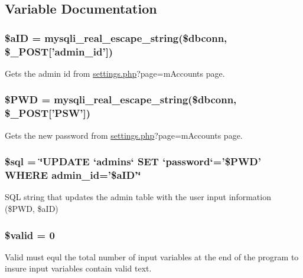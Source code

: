 \subsection{\-Variable \-Documentation}
\hypertarget{adminPReset_8php_a493f3ef0624131954dba9970f1808e66}{
\subsubsection[{\$a\-I\-D}]{\setlength{\rightskip}{0pt plus 5cm}\$a\-I\-D = mysqli\-\_\-real\-\_\-escape\-\_\-string(\$dbconn, \$\-\_\-\-P\-O\-S\-T\mbox{[}'admin\-\_\-id'\mbox{]})}}\label{adminPReset_8php_a493f3ef0624131954dba9970f1808e66}
\-Gets the admin id from \hyperlink{settings_8php}{settings.\-php}?page=m\-Accounts page. \hypertarget{adminPReset_8php_ad10f6388800bdf18e795c1afd61faab1}{
\subsubsection[{\$\-P\-W\-D}]{\setlength{\rightskip}{0pt plus 5cm}\$\-P\-W\-D = mysqli\-\_\-real\-\_\-escape\-\_\-string(\$dbconn, \$\-\_\-\-P\-O\-S\-T\mbox{[}'\-P\-S\-W'\mbox{]})}}\label{adminPReset_8php_ad10f6388800bdf18e795c1afd61faab1}
\-Gets the new password from \hyperlink{settings_8php}{settings.\-php}?page=m\-Accounts page. \hypertarget{adminPReset_8php_a047170d6020a882807665812a27e2525}{
\subsubsection[{\$sql}]{\setlength{\rightskip}{0pt plus 5cm}\$sql = \char`\"{}\-U\-P\-D\-A\-T\-E `admins` \-S\-E\-T `password`='\$\-P\-W\-D' \-W\-H\-E\-R\-E admin\-\_\-id='\$a\-I\-D'\char`\"{}}}\label{adminPReset_8php_a047170d6020a882807665812a27e2525}
\-S\-Q\-L string that updates the admin table with the user input information (\$\-P\-W\-D, \$a\-I\-D) \hypertarget{adminPReset_8php_a0587674d27d00ef497e08e53ccf45bbb}{
\subsubsection[{\$valid}]{\setlength{\rightskip}{0pt plus 5cm}\$valid = 0}}\label{adminPReset_8php_a0587674d27d00ef497e08e53ccf45bbb}
\-Valid must equl the total number of input variables at the end of the program to insure input variables contain valid text. 